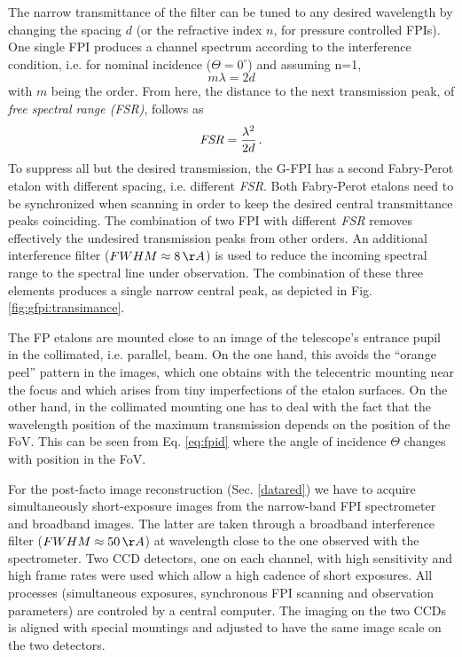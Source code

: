 The narrow transmittance of the filter can be tuned to any desired wavelength by changing the spacing $d$ (or the refractive index $n$, for pressure controlled FPIs). 
One single FPI produces a channel spectrum according to the interference condition, i.e. for nominal incidence ($\Theta = 0^{\circ}$) and assuming n=1,
\begin{equation}
m\lambda = 2 d
\end{equation}
with $m$ being the order. From here, the distance to the next transmission peak, of \emph{free spectral range (FSR)}, follows as
\begin{equation}
\emph{FSR}=\frac{\lambda^{2}}{2d} \, .
\end{equation}
To suppress all but the desired transmission, the G-FPI has a second Fabry-Perot etalon with different spacing, i.e. different \emph{FSR}. Both Fabry-Perot etalons need to be synchronized when scanning in order to keep the desired central transmittance peaks coinciding. The combination of two FPI with different \emph{FSR} removes effectively the undesired  transmission peaks from other orders. An additional interference filter  ($FWHM \approx 8\, \AA %
$) is used to reduce the incoming spectral range to the spectral line under observation. The combination of these three  elements produces a single narrow central peak, as depicted in Fig. \ref{fig:gfpi:transimance}. 

The FP etalons are mounted close to an image of the telescope's entrance pupil in the collimated, i.e. parallel, beam. On the one hand, this avoids the ``orange peel'' pattern in the images, which one obtains with the telecentric mounting near the focus and which arises from tiny imperfections of the etalon surfaces. On the other hand, in the collimated mounting one has to deal with the fact that the wavelength position of the maximum transmission depends on the position of the FoV. This can be seen from Eq. \ref{eq:fpid} where the angle of incidence $\Theta$ changes with position in the FoV.



For the post-facto image reconstruction (Sec. \ref{datared}) we have to acquire simultaneously short-exposure images from the narrow-band FPI spectrometer and broadband images. The latter are taken through a broadband interference filter ($FWHM \approx 50\, \AA $) at wavelength close to the one observed with the spectrometer. Two CCD detectors, one on each channel, with high sensitivity and high frame rates were used which allow a high cadence of short exposures. All processes (simultaneous exposures, synchronous FPI scanning and observation parameters) are controled by a central computer. The imaging on the two CCDs is aligned with special mountings and adjusted to have the same image scale on the two detectors.


